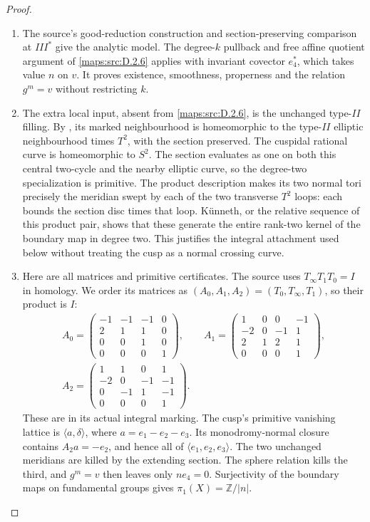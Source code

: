 \begin{proof}
\begin{enumerate}[label=\arabic*.,leftmargin=*]
\item The source's good-reduction construction and section-preserving
comparison at $III^*$ give the analytic model. The degree-$k$
pullback and free affine quotient argument of \ref{maps:src:D.2.6} applies
with invariant covector $e_4^*$, which takes value $n$ on $v$.
It proves existence, smoothness, properness and the relation
$g^m=v$ without restricting $k$.

\item The extra local input, absent from \ref{maps:src:D.2.6}, is the unchanged
type-$II$ filling. By \cite[Lemma 3.10, Proposition 3.11]{manLR26},
its marked neighbourhood is homeomorphic to the type-$II$
elliptic neighbourhood times $T^2$, with the section preserved.
The cuspidal rational curve is homeomorphic to $S^2$.
The section evaluates as one on both this central two-cycle
and the nearby elliptic curve, so the degree-two specialization
is primitive. The product description makes its two normal
tori precisely the meridian swept by each of the two transverse
$T^2$ loops: each bounds the section disc times that loop.
K\"unneth, or the relative sequence of this product pair,
shows that these generate the entire rank-two kernel of
the boundary map in degree two. This justifies the integral
attachment used below without treating the cusp as a normal
crossing curve.

\item Here are all matrices and primitive certificates. The source
uses $T_\infty T_1T_0=I$ in homology. We order its matrices
as $(A_0,A_1,A_2)=(T_0,T_\infty,T_1)$, so their product is $I$:
\[
 \begin{gathered}
 A_0=\begin{pmatrix}-1&-1&-1&0\\2&1&1&0\\0&0&1&0\\0&0&0&1\end{pmatrix},\qquad
 A_1=\begin{pmatrix}1&0&0&-1\\-2&0&-1&1\\2&1&2&1\\0&0&0&1\end{pmatrix},\\
 A_2=\begin{pmatrix}1&1&0&1\\-2&0&-1&-1\\0&-1&1&-1\\0&0&0&1\end{pmatrix}.
 \end{gathered}
\]
These are \cite[Proposition 3.13]{manLR26} in its actual
integral marking. The cusp's primitive vanishing lattice is
$\langle a,\delta\rangle$, where $a=e_1-e_2-e_3$.
Its monodromy-normal closure contains
$A_2a=-e_2$, and hence all of
$\langle e_1,e_2,e_3\rangle$. The two unchanged meridians
are killed by the extending section. The sphere relation kills
the third, and $g^m=v$ then leaves only $ne_4=0$.
Surjectivity of the boundary maps on fundamental groups gives
$\pi_1(X)=\mathbb Z/|n|$.


\end{enumerate}
\end{proof}
